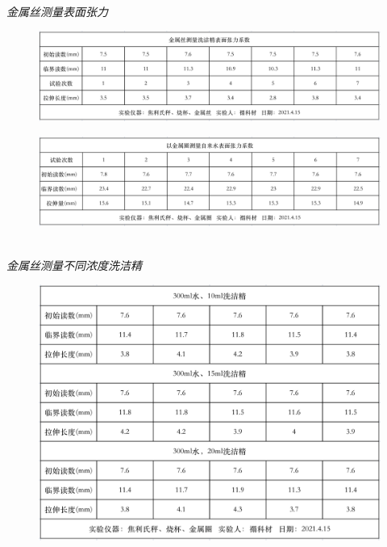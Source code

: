 \documentclass[UTF8]{ctexart}
\begin{document}
    \begin{center}
        \emph{\\[0.01cm]金属丝测量表面张力}
    \end{center}

    \begin{figure}[ht]
        \centering 
        \includegraphics[width=13cm]{洗洁精.png}
    \end{figure}

    \begin{figure}[ht]
        \centering 
        \includegraphics[width=13cm]{自来水.png}
    \end{figure}
        
    \begin{center}
        \emph{\\[0.01cm]金属丝测量不同浓度洗洁精}
    \end{center}

    \begin{figure}[ht]
        \centering 
        \includegraphics[width=13cm]{不同.png}
    \end{figure}
\end{document}

